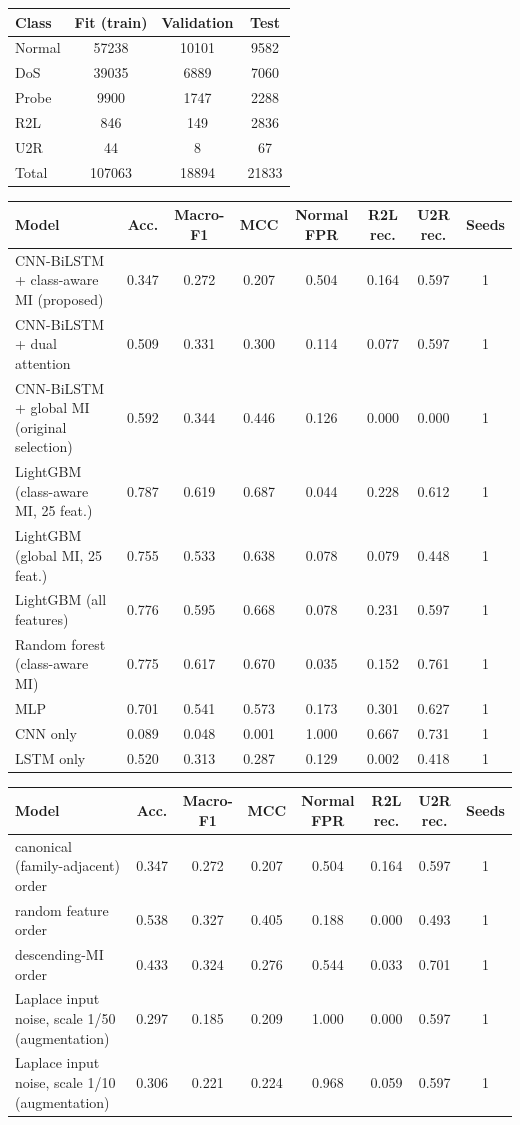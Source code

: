 \begin{tabular}{lccc}
\toprule
Class & Fit (train) & Validation & Test \\
\midrule
Normal & 57238 & 10101 & 9582 \\
DoS & 39035 & 6889 & 7060 \\
Probe & 9900 & 1747 & 2288 \\
R2L & 846 & 149 & 2836 \\
U2R & 44 & 8 & 67 \\
Total & 107063 & 18894 & 21833 \\
\bottomrule
\end{tabular}

\begin{tabular}{lccccccc}
\toprule
Model & Acc. & Macro-F1 & MCC & Normal FPR & R2L rec. & U2R rec. & Seeds \\
\midrule
CNN-BiLSTM + class-aware MI (proposed) & 0.347 & 0.272 & 0.207 & 0.504 & 0.164 & 0.597 & 1 \\
CNN-BiLSTM + dual attention & 0.509 & 0.331 & 0.300 & 0.114 & 0.077 & 0.597 & 1 \\
CNN-BiLSTM + global MI (original selection) & 0.592 & 0.344 & 0.446 & 0.126 & 0.000 & 0.000 & 1 \\
LightGBM (class-aware MI, 25 feat.) & 0.787 & 0.619 & 0.687 & 0.044 & 0.228 & 0.612 & 1 \\
LightGBM (global MI, 25 feat.) & 0.755 & 0.533 & 0.638 & 0.078 & 0.079 & 0.448 & 1 \\
LightGBM (all features) & 0.776 & 0.595 & 0.668 & 0.078 & 0.231 & 0.597 & 1 \\
Random forest (class-aware MI) & 0.775 & 0.617 & 0.670 & 0.035 & 0.152 & 0.761 & 1 \\
MLP & 0.701 & 0.541 & 0.573 & 0.173 & 0.301 & 0.627 & 1 \\
CNN only & 0.089 & 0.048 & 0.001 & 1.000 & 0.667 & 0.731 & 1 \\
LSTM only & 0.520 & 0.313 & 0.287 & 0.129 & 0.002 & 0.418 & 1 \\
\bottomrule
\end{tabular}

\begin{tabular}{lccccccc}
\toprule
Model & Acc. & Macro-F1 & MCC & Normal FPR & R2L rec. & U2R rec. & Seeds \\
\midrule
canonical (family-adjacent) order & 0.347 & 0.272 & 0.207 & 0.504 & 0.164 & 0.597 & 1 \\
random feature order & 0.538 & 0.327 & 0.405 & 0.188 & 0.000 & 0.493 & 1 \\
descending-MI order & 0.433 & 0.324 & 0.276 & 0.544 & 0.033 & 0.701 & 1 \\
Laplace input noise, scale 1/50 (augmentation) & 0.297 & 0.185 & 0.209 & 1.000 & 0.000 & 0.597 & 1 \\
Laplace input noise, scale 1/10 (augmentation) & 0.306 & 0.221 & 0.224 & 0.968 & 0.059 & 0.597 & 1 \\
\bottomrule
\end{tabular}


